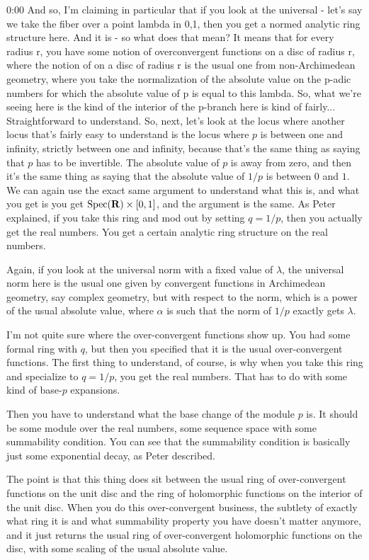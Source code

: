\begin{unfinished}{0:00}
And so, I'm claiming in particular that if you look at the universal - let's say we take the fiber over a point lambda in 0,1, then you get a normed analytic ring structure here. And it is - so what does that mean? It means that for every radius r, you have some notion of overconvergent functions on a disc of radius r, where the notion of on a disc of radius r is the usual one from non-Archimedean geometry, where you take the normalization of the absolute value on the p-adic numbers for which the absolute value of p is equal to this lambda. So, what we're seeing here is the kind of the interior of the p-branch here is kind of fairly...
Straightforward to understand. So, next, let's look at the locus where another locus that's fairly easy to understand is the locus where $p$ is between one and infinity, strictly between one and infinity, because that's the same thing as saying that $p$ has to be invertible. The absolute value of $p$ is away from zero, and then it's the same thing as saying that the absolute value of $1/p$ is between $0$ and $1$. We can again use the exact same argument to understand what this is, and what you get is you get $\text{Spec}(\mathbf R) \times [0,1]$, and the argument is the same. As Peter explained, if you take this ring and mod out by setting $q = 1/p$, then you actually get the real numbers. You get a certain analytic ring structure on the real numbers.

Again, if you look at the universal norm with a fixed value of $\lambda$, the universal norm here is the usual one given by convergent functions in Archimedean geometry, say complex geometry, but with respect to the norm, which is a power of the usual absolute value, where $\alpha$ is such that the norm of $1/p$ exactly gets $\lambda$.

I'm not quite sure where the over-convergent functions show up. You had some formal ring with $q$, but then you specified that it is the usual over-convergent functions. The first thing to understand, of course, is why when you take this ring and specialize to $q = 1/p$, you get the real numbers. That has to do with some kind of base-$p$ expansions.

Then you have to understand what the base change of the module $p$ is. It should be some module over the real numbers, some sequence space with some summability condition. You can see that the summability condition is basically just some exponential decay, as Peter described.

The point is that this thing does sit between the usual ring of over-convergent functions on the unit disc and the ring of holomorphic functions on the interior of the unit disc. When you do this over-convergent business, the subtlety of exactly what ring it is and what summability property you have doesn't matter anymore, and it just returns the usual ring of over-convergent holomorphic functions on the disc, with some scaling of the usual absolute value.


\end{unfinished}
